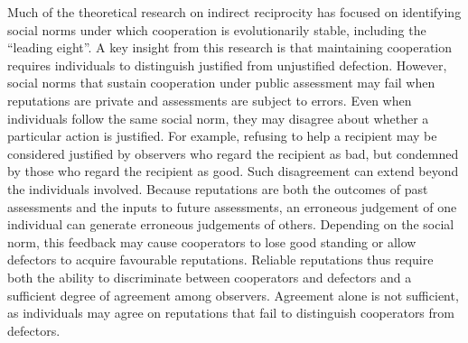 Much of the theoretical research on indirect reciprocity has focused on identifying social norms under which cooperation is evolutionarily stable, including the ``leading eight''\cite{brandt2004,ohtsuki2004,pacheco2006,ohtsuki2006,santos2018,kessinger2023,murase2024computational}. A key insight from this research is that maintaining cooperation requires individuals to distinguish justified from unjustified defection\cite{sugden1986,kandori1992,leimar2001,panchanathan2003,ohtsuki2006}. However, social norms that sustain cooperation under public assessment may fail when reputations are private and assessments are subject to errors\cite{takahashi2006,uchida2010,hilbe2018,okada2018,perret2021,fujimoto2022,fujimoto2023}. Even when individuals follow the same social norm, they may disagree about whether a particular action is justified. For example, refusing to help a recipient may be considered justified by observers who regard the recipient as bad, but condemned by those who regard the recipient as good\cite{hilbe2018,radzvilavicius2019,okada2020dilemmas}. Such disagreement can extend beyond the individuals involved. Because reputations are both the outcomes of past assessments and the inputs to future assessments, an erroneous judgement of one individual can generate erroneous judgements of others\cite{hilbe2018,uchida2013,fujimoto2022}. Depending on the social norm, this feedback may cause cooperators to lose good standing or allow defectors to acquire favourable reputations\cite{okada2020dilemmas,morsky2024,fujimoto2023}. Reliable reputations thus require both the ability to discriminate between cooperators and defectors and a sufficient degree of agreement among observers\cite{michelmata2024,murase2024synchronization}. Agreement alone is not sufficient, as individuals may agree on reputations that fail to distinguish cooperators from defectors.

